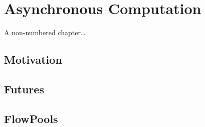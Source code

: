 \chapter*{Asynchronous Computation}
A non-numbered chapter\dots

\section{Motivation}
\section{Futures}
\section{FlowPools}

\lipsum[1]
